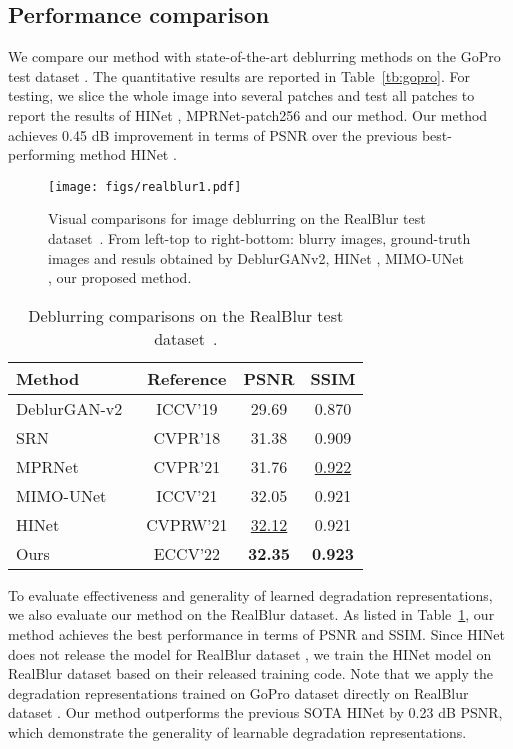 \documentclass[runningheads]{llncs}
\begin{document}
\subsection{Performance comparison}


We compare our method with state-of-the-art deblurring methods \cite{HINet,Zamir2021MPRNet,MIMO_UNet} on the GoPro test dataset \cite{deblur-multi-scale}. The quantitative results are reported in Table~\ref{tb:gopro}.
For testing, we slice the whole image into several  patches and test all patches to report the results of HINet \cite{HINet}, MPRNet-patch256 \cite{Zamir2021MPRNet} and our method.
Our method achieves 0.45 dB improvement in terms of PSNR over the previous best-performing method HINet \cite{HINet}. 
\begin{figure*}[t]
  \centering
   \texttt{[image: figs/realblur1.pdf]}
   \caption{Visual comparisons for image deblurring on the RealBlur test dataset~\cite{realblur}. From left-top to right-bottom: blurry images, ground-truth images and resuls obtained by DeblurGANv2, HINet \cite{HINet}, MIMO-UNet \cite{MIMO_UNet}, our proposed method.}
   \label{fig:realblur}
\end{figure*}
\begin{table}[t]
\centering
		\begin{tabular}{l|ccc}
			\hline
			Method & Reference & PSNR & SSIM \\  \hline
			DeblurGAN-v2~\cite{kupyn2019deblurgan} & ICCV'19 & 29.69 & 0.870 \\
			SRN~\cite{tao2018srndeblur} & CVPR'18 & 31.38 & 0.909 \\ 
			MPRNet~\cite{Zamir2021MPRNet} & CVPR'21 & 31.76 & \underline{0.922} \\
			MIMO-UNet \cite{MIMO_UNet} & ICCV'21  & 32.05 & 0.921 \\ 
			HINet \cite{HINet} & CVPRW'21  & \underline{32.12} & 0.921 \\ \hline
			Ours & ECCV'22 & \textbf{32.35}  & \textbf{0.923} \\ \hline
		\end{tabular}
	\caption{Deblurring comparisons on the RealBlur test dataset~\cite{realblur}. }
	\label{tb:realblur}
\end{table} To evaluate effectiveness and generality of learned degradation representations, we also evaluate our method on the RealBlur dataset. As listed in Table~\ref{tb:realblur}, our method achieves the best performance in terms of PSNR and SSIM. Since HINet \cite{HINet} does not release the model for RealBlur dataset \cite{realblur}, we train the HINet model on RealBlur dataset based on their released training code.
Note that we apply the degradation representations trained on GoPro dataset \cite{deblur-multi-scale} directly on RealBlur dataset \cite{realblur}.
Our method outperforms the previous SOTA HINet \cite{HINet} by 0.23 dB PSNR, which demonstrate the generality of learnable degradation representations.
\end{document}
